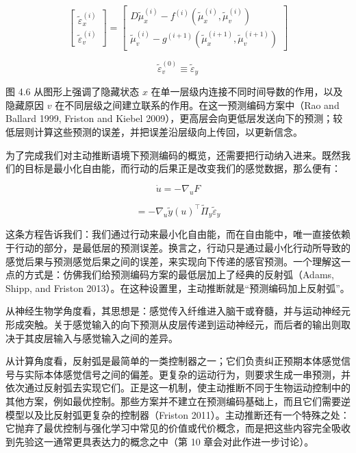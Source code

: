 \begin{equation}
\begin{bmatrix}
\tilde{\varepsilon}_x^{(i)} \\
\tilde{\varepsilon}_v^{(i)}
\end{bmatrix}
=
\begin{bmatrix}
D\tilde{\mu}_x^{(i)} - f^{(i)}(\tilde{\mu}_x^{(i)}, \tilde{\mu}_v^{(i)}) \\
\tilde{\mu}_v^{(i)} - g^{(i+1)}(\tilde{\mu}_x^{(i+1)}, \tilde{\mu}_v^{(i+1)})
\end{bmatrix}
\tag{4.21}
\end{equation}

\begin{equation}
\tilde{\varepsilon}_v^{(0)} \equiv \tilde{\varepsilon}_y
\tag{4.21}
\end{equation}

图 4.6 从图形上强调了隐藏状态 $x$ 在单一层级内连接不同时间导数的作用，以及隐藏原因 $v$ 在不同层级之间建立联系的作用。在这一预测编码方案中（Rao and Ballard 1999, Friston and Kiebel 2009），更高层会向更低层发送向下的预测；较低层则计算这些预测的误差，并把误差沿层级向上传回，以更新信念。

为了完成我们对主动推断语境下预测编码的概览，还需要把行动纳入进来。既然我们的目标是最小化自由能，而行动的后果正是改变我们的感觉数据，那么便有：

\begin{equation}
\dot{u} = -\nabla_u F
\tag{4.22}
\end{equation}

\begin{equation}
= -\nabla_u \tilde{y}(u)^{\top}\tilde{\Pi}_y\tilde{\varepsilon}_y
\tag{4.22}
\end{equation}

这条方程告诉我们：我们通过行动来最小化自由能，而在自由能中，唯一直接依赖于行动的部分，是最低层的预测误差。换言之，行动只是通过最小化行动所导致的感觉后果与预测感觉后果之间的误差，来实现向下传递的感官预测。一个理解这一点的方式是：仿佛我们给预测编码方案的最低层加上了经典的反射弧（Adams, Shipp, and Friston 2013）。在这种设置里，主动推断就是“预测编码加上反射弧”。

从神经生物学角度看，其思想是：感觉传入纤维进入脑干或脊髓，并与运动神经元形成突触。关于感觉输入的向下预测从皮层传递到运动神经元，而后者的输出则取决于其皮层输入与感觉输入之间的差异。

从计算角度看，反射弧是最简单的一类控制器之一；它们负责纠正预期本体感觉信号与实际本体感觉信号之间的偏差。更复杂的运动行为，则要求生成一串预测，并依次通过反射弧去实现它们。正是这一机制，使主动推断不同于生物运动控制中的其他方案，例如最优控制。那些方案并不建立在预测编码基础上，而且它们需要逆模型以及比反射弧更复杂的控制器（Friston 2011）。主动推断还有一个特殊之处：它抛弃了最优控制与强化学习中常见的价值或代价概念，而是把这些内容完全吸收到先验这一通常更具表达力的概念之中（第 10 章会对此作进一步讨论）。

